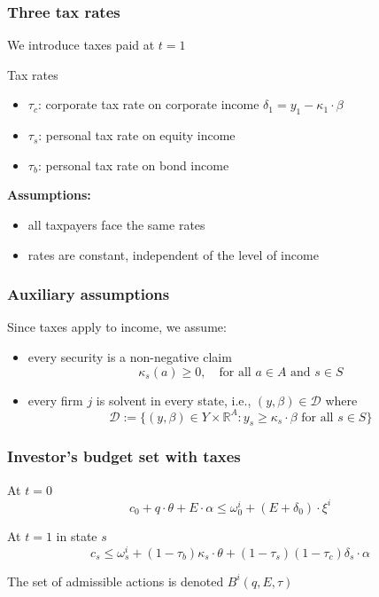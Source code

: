 \documentclass[blue]{beamer}
\def\R{\mathbb{R}}
\def\leq{\leqslant}
\def\geq{\geqslant}
\theoremstyle{definition}
\theoremstyle{example}
\begin{document}
\begin{frame}\frametitle{Three tax rates}
We introduce taxes paid at $t=1$
\bigskip

\begin{block}{Tax rates}
\begin{itemize}
\item $\tau_c$: corporate tax rate on corporate income $\delta_1 = y_1 - \kappa_1 \cdot \beta$
\item $\tau_s$: personal tax rate on equity income
\item $\tau_b$: personal tax rate on bond income
\end{itemize}
\end{block}
\bigskip

\textbf{Assumptions:}
\begin{itemize}
\item all taxpayers face the same rates
\item rates are constant, independent of the level of income
\end{itemize}
\end{frame}

\begin{frame}\frametitle{Auxiliary assumptions}
Since taxes apply to income, we assume:
\bigskip

\begin{itemize}
\item every security is a non-negative claim
\begin{equation*}
\kappa_s(a) \geq 0, \quad \text{for all $a \in A$ and $s \in S$}
\end{equation*}
\bigskip
\item every firm $j$ is solvent in every state, i.e., $(y, \beta) \in \mathcal{D}$ where
\begin{equation*}
\mathcal{D} := \bigl\{ (y, \beta) \in Y \times \R^A \colon y_s \geq \kappa_s \cdot \beta \text{ for all $s \in S$} \bigr\}
\end{equation*}
\end{itemize}
\end{frame}

\begin{frame}\frametitle{Investor's budget set with taxes}
\begin{block}{At $t=0$}
\begin{equation*}
c_0 + q \cdot \theta + E \cdot \alpha \leq \omega^i_0 + (E + \delta_0) \cdot \xi^i
\end{equation*}
\end{block}

\begin{block}{At $t=1$ in state $s$}
\begin{equation*}
c_s \leq \omega^i_s + (1-\tau_b) \kappa_s \cdot \theta + (1-\tau_s)(1-\tau_c) \delta_s \cdot \alpha
\end{equation*}
\end{block}
\bigskip

The set of admissible actions is denoted $B^i(q, E, \tau)$
\end{frame}
\end{document}
